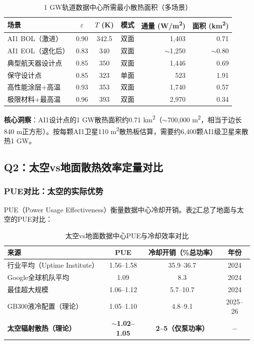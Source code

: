 \begin{table}[H]
\centering
\footnotesize
\caption{1 GW轨道数据中心所需最小散热面积（多场景）}
\label{tab:onegw_area}
\begin{tabular}{lcccrr}
\toprule
\textbf{场景} & $\varepsilon$ & $T$ (K) & \textbf{模式} & \textbf{通量 (W/m\textsuperscript{2})} & \textbf{面积 (km\textsuperscript{2})} \\
\midrule
AI1 BOL（激进） & 0.90 & 342.5 & 双面 & 1,403 & 0.71 \\
AI1 EOL（退化后） & 0.83 & 340 & 双面 & $\sim$1,250 & $\sim$0.80 \\
典型航天器设计点 & 0.85 & 350 & 双面 & 1,446 & 0.69 \\
保守设计点 & 0.85 & 323 & 单面 & 523 & 1.91 \\
高性能涂层+高温 & 0.93 & 353 & 双面 & 1,740 & 0.57 \\
极限材料+最高温 & 0.96 & 393 & 双面 & 2,970 & 0.34 \\
\bottomrule
\end{tabular}
\end{table}

\textbf{核心洞察}：AI1设计点的1 GW散热面积约0.71 km\textsuperscript{2}（$\sim$700,000 m\textsuperscript{2}，相当于边长840 m正方形）。按每颗AI1卫星110 m\textsuperscript{2}散热板估算，需要约6,400颗AI1级卫星来散热1 GW\cite{nasa2024sst,cybernative2026thermo}。

\subsection{Q2：太空vs地面散热效率定量对比}

\subsubsection{PUE对比：太空的实际优势}

PUE（Power Usage Effectiveness）衡量数据中心冷却开销。表\ref{tab:pue_compare}汇总了地面与太空的PUE对比：

\begin{table}[H]
\centering
\caption{太空vs地面数据中心PUE与冷却效率对比}
\label{tab:pue_compare}
\begin{tabular}{lccc}
\toprule
\textbf{来源} & \textbf{PUE} & \textbf{冷却开销（\%总功率）} & \textbf{年份} \\
\midrule
行业平均（Uptime Institute） & 1.56--1.58 & 35.9--36.7 & 2024 \\
Google全球机队平均 & 1.09 & 8.3 & 2024 \\
最佳超大规模 & 1.06--1.12 & 5.7--10.7 & 2024 \\
GB300液冷配置（理论） & 1.05--1.10 & 4.8--9.1 & 2025--26 \\
\rowcolor{gray!10}
\textbf{太空辐射散热（理论）} & \textbf{$\sim$1.02--1.05} & \textbf{2--5（仅泵功率）} & \textbf{--} \\
\bottomrule
\end{tabular}
\end{table}

